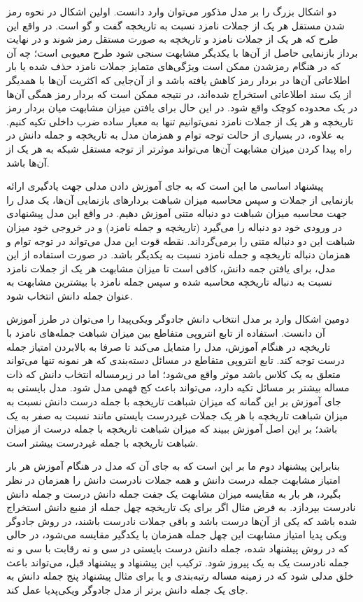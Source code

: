 دو اشکال بزرگ را بر مدل مذکور می‌توان وارد دانست. اولین اشکال در نحوه رمز شدن مستقل هر یک از جملات نامزد نسبت به تاریخچه گفت و گو است. در واقع این طرح که هر یک از جملات نامزد و تاریخچه به صورت مستقل رمز شوند و در نهایت برداز بازنمایی حاصل از آن‌ها با یکدیگر مشابهت سنجی شود طرح معیوبی است؛ چه آن که در هنگام رمزشدن ممکن است ويژگی‌های متمایز جملات نامزد حذف شده یا بار اطلاعاتی آن‌ها در بردار رمز کاهش یافته باشد و از آن‌جایی که اکثریت آن‌ها با همدیگر از یک سند اطلاعاتی استخراج شده‌اند، در نتیجه ممکن است که بردار رمز همگی‌ آن‌ها در یک محدوده کوچک واقع شود. در این حال برای یافتن میزان مشابهت میان بردار رمز تاریخچه و هر یک از جملات نامزد نمی‌توانیم تنها به معیار ساده ضرب داخلی تکیه کنیم. به علاوه، در بسیاری از حالت توجه توام و همزمان مدل به تاریخچه و جمله دانش در راه پیدا کردن میزان مشابهت آن‌ها می‌تواند موثرتر از توجه مستقل شبکه به هر یک از آن‌ها باشد. 

پیشنهاد اساسی ما این است که به جای آموزش دادن مدلی جهت یادگیری ارائه بازنمایی از جملات و سپس محاسبه میزان شباهت بردار‌های بازنمایی آن‌ها، یک مدل را جهت محاسبه میزان شباهت دو دنباله متنی آموزش دهیم. در واقع این مدل پیشنهادی در ورودی خود دو دنباله را می‌گیرد (تاریخچه و جمله نامزد) و در خروجی خود میزان شباهت این دو دنباله متنی را برمی‌گرداند. نقطه قوت این مدل می‌تواند در توجه توام و همزمان دنباله تاریخچه و جمله نامزد نسبت به یکدیگر باشد. در صورت استفاده از این مدل، برای یافتن جمه دانش، کافی است تا میزان مشابهت هر یک از جملات نامزد نسبت به دنباله تاریخچه محاسبه شده و سپس جمله‌ نامزد با بیشترین مشابهت به عنوان جمله دانش انتخاب شود. 

دومین اشکال وارد بر مدل انتخاب دانش جادوگر ویکی‌پیدا را می‌توان در طرز آموزش آن دانست. استفاده از تابع انتروپی متفاطع بین میزان شباهت جمله‌های نامزد با تاریخچه در هنگام آموزش، مدل را متمایل می‌کند تا صرفا به بالابردن امتیاز جمله درست توجه کند. تابع انتروپی متقاطع در مسائل دسته‌بندی که هر نمونه تنها می‌تواند متعلق به یک کلاس باشد موثر واقع می‌شود؛ اما در زیرمساله انتخاب دانش که ذات مساله بیشتر بر مسائل
تکیه دارد، می‌تواند باعث کج فهمی مدل شود. مدل بایستی به جای آموزش بر این گمانه که میزان شباهت تاریخچه با جمله درست دانش نسبت به میزان شباهت تاریخچه با هر یک جملات غیردرست بایستی مانند نسبت به صفر به یک باشد؛ بر این اصل آموزش ببیند که میزان شباهت تاریخچه با جمله درست از میزان شباهت تاریخچه با جمله غیردرست بیشتر است. 

بنابراین پیشنهاد دوم ما بر این است که به جای آن که مدل در هنگام آموزش هر بار امتیاز مشابهت جمله درست دانش و همه جملات نادرست دانش را همزمان در نظر بگیرد، هر بار به مقایسه میزان مشابهت یک جفت جمله دانش درست و جمله دانش نادرست بپردازد. به فرض مثال اگر برای یک تاریخچه چهل جمله از منبع دانش استخراج شده باشد که یکی از آن‌ها درست باشد و باقی جملات نادرست باشند، در روش جادوگر ویکی پدیا امتیاز مشابهت این چهل جمله همزمان با یکدگیر مقایسه می‌شود، در حالی که در روش پیشنهاد شده، جمله دانش درست بایستی در سی و نه رقابت با سی و نه جمله نادرست یک به یک پیروز شود. ترکیب این پیشنهاد 
و پیشنهاد قبل، می‌تواند باعث خلق مدلی شود که در زمینه مساله رتبه‌بندی 
و یا برای مثال پیشنهاد پنج جمله دانش به جای یک جمله دانش
برتر از مدل جادوگر ویکی‌پدیا عمل کند.

